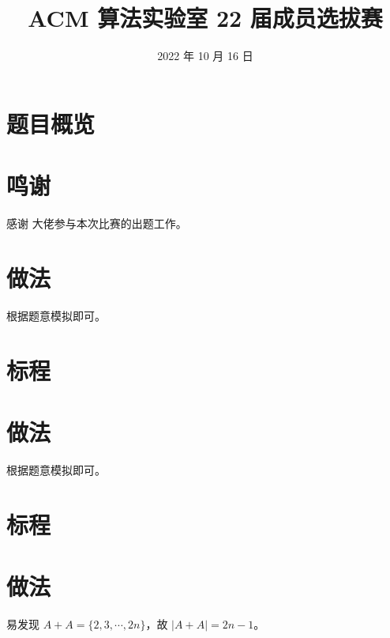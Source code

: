 \documentclass{../cpct/ctsol}
\title{ACM 算法实验室 22 届成员选拔赛}
\date{2022 年 10 月 16 日}
\begin{document}
\maketitle
{}

\section*{题目概览}

\solutiontab

\section*{鸣谢}

感谢 \href{https://github.com/Tiphereth-A}{\@Tifa} 大佬参与本次比赛的出题工作。

\makesolution
\section*{做法}

根据题意模拟即可。

\section*{标程}


\makesolution
\section*{做法}

根据题意模拟即可。

\section*{标程}


\makesolution
\section*{做法}

易发现 $A+A = \{2,3,\cdots,2n \}$，故 $|A+A|=2n-1$。
\end{document}
